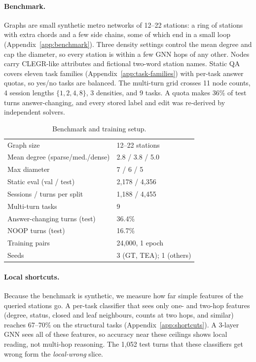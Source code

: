 \documentclass[11pt]{article}
\begin{document}
\paragraph{Benchmark.}
Graphs are small synthetic metro networks of 12--22 stations: a ring of stations with extra chords and a few side chains, some of which end in a small loop (Appendix~\ref{app:benchmark}).
Three density settings control the mean degree and cap the diameter, so every station is within a few GNN hops of any other.
Nodes carry CLEGR-like attributes and fictional two-word station names.
Static QA covers eleven task families (Appendix~\ref{app:task-families}) with per-task answer quotas, so yes/no tasks are balanced.
The multi-turn grid crosses 11 node counts, 4 session lengths $\{1,2,4,8\}$, 3 densities, and 9 tasks.
A quota makes 36\% of test turns answer-changing, and every stored label and edit was re-derived by independent solvers.

\begin{table}[t]
\centering
\small
\begin{tabular}{@{}ll@{}}
\toprule
Graph size & 12--22 stations \\
Mean degree (sparse/med./dense) & 2.8 / 3.8 / 5.0 \\
Max diameter & 7 / 6 / 5 \\
Static eval (val / test) & 2{,}178 / 4{,}356 \\
Sessions / turns per split & 1{,}188 / 4{,}455 \\
Multi-turn tasks & 9 \\
Answer-changing turns (test) & 36.4\% \\
NOOP turns (test) & 16.7\% \\
Training pairs & 24{,}000, 1 epoch \\
Seeds & 3 (GT, TEA); 1 (others) \\
\bottomrule
\end{tabular}
\caption{Benchmark and training setup.}
\label{tab:setup}
\end{table}

\paragraph{Local shortcuts.}
Because the benchmark is synthetic, we measure how far simple features of the queried stations go.
A per-task classifier that sees only one- and two-hop features (degree, status, closed and leaf neighbours, counts at two hops, and similar) reaches 67--70\% on the structural tasks (Appendix~\ref{app:shortcuts}).
A 3-layer GNN sees all of these features, so accuracy near these ceilings shows local reading, not multi-hop reasoning.
The 1{,}052 test turns that these classifiers get wrong form the \emph{local-wrong} slice.
\end{document}
